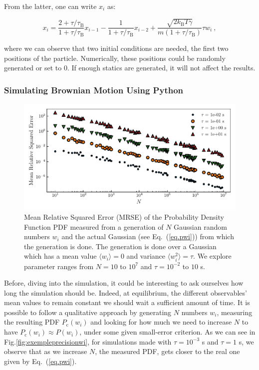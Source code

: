 From the latter, one can write $x_i$ as:

\begin{equation} 
	x_i = \frac{2 + \tau /\tau_\mathrm{B}}{1 + \tau / \tau_\mathrm{B} } x_{i-1} 
	- \frac{1}{1 + \tau / \tau_\mathrm{B}}x_{i-2}
	+ \frac{\sqrt{2k_\mathrm{B}T\gamma}}{m(1 + \tau/\tau_\mathrm{B})} \tau w_i ~,
	\label{Eq.numfulllangevin}
\end{equation}

where we can observe that two initial conditions are needed, the first two positions of the particle. Numerically, these positions could be randomly generated or  set to $0$. If enough statics are generated, it will not affect the results.

\subsubsection{Simulating Brownian Motion Using Python}

\begin{figure}[h]
	\centering
	\includegraphics{02_body/chapter1/image/noise_simulation/MSE.pdf}
	\caption{Mean Relative Squared Error (\gls{MRSE}) of the Probability Density Function \gls{PDF} measured from a generation of $N$ Gaussian random numbers $w_i$ and the actual Gaussian (see Eq.~(\ref{eq.pwi})) from which the generation is done. The generation is done over a Gaussian which has a mean value $\langle w_i \rangle =0$ and variance $\langle w_i^2 \rangle = \tau$. We explore parameter ranges from $N = 10$ to $10^7$ and $\tau = 10^{-2}$ to $10$ s.}  
	\label{fig:MSEwi}
\end{figure}

Before, diving into the simulation, it could be interesting to ask ourselves how long the simulation should be. Indeed, at equilibrium, the different observables' mean values to remain constant we should wait a sufficient amount of time. It is possible to follow a qualitative approach by generating $N$ numbers $w_i$, measuring the resulting \gls{PDF} $P_\mathrm{c}(w_i)$ and looking for how much we need to increase $N$ to have $P_\mathrm{c}(w_i) \approx P(w_i)$, under some given small-error criterion. As we can see in Fig.\ref{fig:exempleprecisionwi}, for simulations made with $\tau = 10^{-3}$ s and $\tau = 1$ s, we observe that as we increase $N$, the measured PDF, gets closer to the real one given by Eq.~(\ref{eq.pwi}). 




